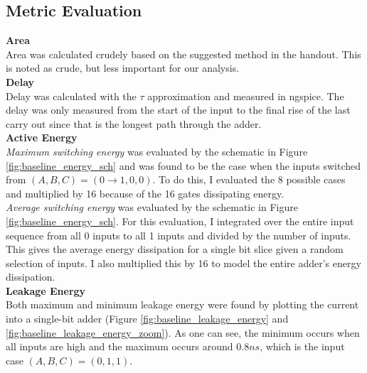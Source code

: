 \documentclass{article}
\begin{document}
\subsection{Metric Evaluation}
\textbf{Area}\\
Area was calculated crudely based on the suggested method in the handout. This is noted as crude, but less important for our analysis.\\
\textbf{Delay}\\
Delay was calculated with the $\tau$ approximation and measured in ngspice. The delay was only measured from the start of the input to the final rise of the last carry out since that is the longest path through the adder.\\
\textbf{Active Energy}\\
\textit{Maximum switching energy} was evaluated by the schematic in Figure \ref{fig:baseline_energy_sch} and was found to be the case when the inputs switched from $(A, B, C) = (0 \rightarrow 1, 0, 0)$. To do this, I evaluated the 8 possible cases and multiplied by 16 because of the 16 gates dissipating energy. \\
\textit{Average switching energy} was evaluated by the schematic in Figure \ref{fig:baseline_energy_sch}. For this evaluation, I integrated over the entire input sequence from all 0 inputs to all 1 inputs and divided by the number of inputs. This gives the average energy dissipation for a single bit slice given a random selection of inputs. I also multiplied this by 16 to model the entire adder's energy dissipation.\\
\textbf{Leakage Energy}\\
Both maximum and minimum leakage energy were found by plotting the current into a single-bit adder (Figure \ref{fig:baseline_leakage_energy} and \ref{fig:baseline_leakage_energy_zoom}). As one can see, the minimum occurs when all inputs are high and the maximum occurs around $0.8ns$, which is the input case $(A, B, C) = (0, 1, 1)$.
\end{document}
